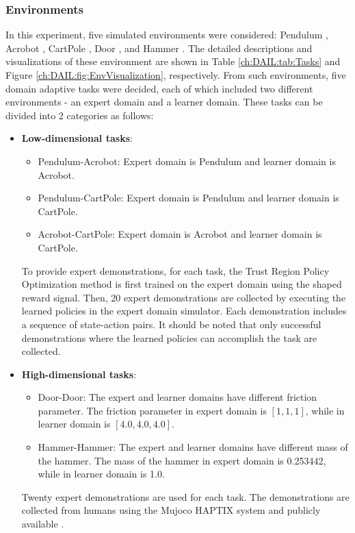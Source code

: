\subsubsection{Environments}

In this experiment,
five simulated environments were considered:
Pendulum \cite{Task_OpenAIGym},
Acrobot \cite{Task_OpenAIGym,Task_Acrobot1,Task_Acrobot2},
CartPole \cite{Task_OpenAIGym,Task_CartPole},
Door \cite{Task_Adroit},
and Hammer \cite{Task_Adroit}.
The detailed descriptions and visualizations of these environment are shown in Table \ref{ch:DAIL:tab:Tasks} and Figure \ref{ch:DAIL:fig:EnvVisualization},
respectively.
From such environments,
five domain adaptive tasks were decided,
each of which included two different environments - an expert domain and a learner domain.
These tasks can be divided into 2 categories as follows:

\begin{itemize}
  \item \textbf{Low-dimensional tasks}:
        \begin{itemize}
          \item Pendulum-Acrobot: Expert domain is Pendulum and learner domain is Acrobot.
          \item Pendulum-CartPole: Expert domain is Pendulum and learner domain is CartPole.
          \item Acrobot-CartPole: Expert domain is Acrobot and learner domain is CartPole.
        \end{itemize}
        To provide expert demonstrations,
        for each task,
        the Trust Region Policy Optimization method \cite{RL_TRPO} is first trained on the expert domain using the shaped reward signal.
        Then,
        20 expert demonstrations are collected by executing the learned policies in the expert domain simulator.
        Each demonstration includes a sequence of state-action pairs.
        It should be noted that only successful demonstrations where the learned policies can accomplish the task are collected.

  \item \textbf{High-dimensional tasks}:
        \begin{itemize}
          \item Door-Door: The expert and learner domains have different friction parameter. The friction parameter in expert domain is $[1, 1, 1]$, while in learner domain is $[4.0, 4.0, 4.0]$.
          \item Hammer-Hammer: The expert and learner domains have different mass of the hammer. The mass of the hammer in expert domain is 0.253442, while in learner domain is 1.0.
        \end{itemize}
        Twenty expert demonstrations are used for each task.
        The demonstrations are collected from humans using the Mujoco HAPTIX system \cite{Mujoco_HAPTIX} and publicly available \cite{Task_Adroit}.
\end{itemize}

